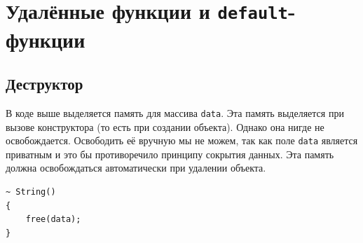 \documentclass{article}
\begin{document}
\section*{Удалённые функции и \texttt{default}-функции}


\iffalse
\subsection*{Деструктор}
В коде выше выделяется память для массива \texttt{data}. Эта память выделяется при вызове конструктора (то есть при создании объекта). Однако она нигде не освобождается. Освободить её вручную мы не можем, так как поле \texttt{data} является приватным и это бы противоречило принципу сокрытия данных. Эта память должна освобождаться автоматически при удалении объекта.
\begin{lstlisting}
~ String() 
{
    free(data);
}
\end{lstlisting}
\end{document}
